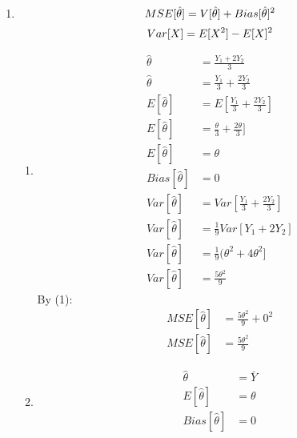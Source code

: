 \documentclass{article}
\begin{document}

\begin{enumerate}

\item 

\begin{equation}
MSE[\hat{\theta}] = V[\hat{\theta}] + Bias[\hat{\theta}]^{2} \\
\end{equation}
\begin{equation}
Var[X] = E[X^{2}] - E[X]^{2} \\
\end{equation}
\begin{enumerate}
\item 
\begin{equation*}
\begin{split}
\hat{\theta} &= \frac{Y_{1} + 2 Y_{2}}{3} \\
\hat{\theta} &= \frac{Y_{1}}{3} + \frac{2 Y_{2}}{3} \\
E[\hat{\theta}] &= E[\frac{Y_{1}}{3} + \frac{2 Y_{2}}{3}] \\
E[\hat{\theta}] &=\frac{\theta}{3} + \frac{2\theta}{3}] \\
E[\hat{\theta}] &= \theta \\
Bias[\hat{\theta}] &= 0 \\
Var[\hat{\theta}] &= Var[\frac{Y_{1}}{3} + \frac{2 Y_{2}}{3}] \\
Var[\hat{\theta}] &= \frac{1}{9} Var[Y_{1} + 2 Y_{2}] \\
Var[\hat{\theta}] &= \frac{1}{9} (\theta^{2}+ 4 \theta^{2}] \\
Var[\hat{\theta}] &= \frac{5\theta^{2}}{9}
\end{split}
\end{equation*}
By (1):
\begin{equation*}
\begin{split}
MSE[\hat{\theta}] &= \frac{5\theta^{2}}{9} + 0^{2} \\
MSE[\hat{\theta}] &= \frac{5\theta^{2}}{9}
\end{split}
\end{equation*}
\item
\begin{equation*}
\begin{split}
\hat{\theta} &= \bar{Y} \\
E[\hat{\theta}] &= \theta \\
Bias[\hat{\theta}] &= 0 \\

\end{split}
\end{equation*}
\end{enumerate}
\end{enumerate}
\end{document}

